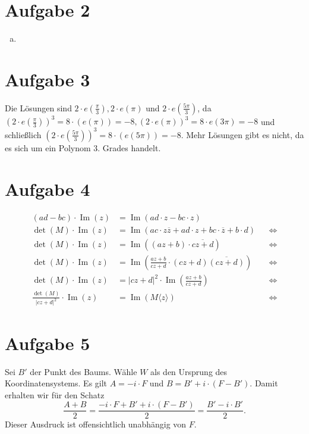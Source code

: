 \documentclass{article}
\theoremstyle{definition}
\newcommand{\Ima}{\operatorname{Im}}
\begin{document}
\section*{Aufgabe 2}
\begin{enumerate}[(a)]
	\item 
\end{enumerate}
\section*{Aufgabe 3}
Die Lösungen sind $2 \cdot e\left(\frac{\pi}{3}\right), 2 \cdot e\left(\pi\right)$ und $2 \cdot e\left(\frac{5\pi}{3}\right)$, da $\left(2 \cdot e\left(\frac{\pi}{3}\right)\right)^3 = 8 \cdot(e(\pi)) = -8, \left(2 \cdot e\left(\pi\right)\right)^3 = 8 \cdot e(3\pi) = -8$ und schließlich $\left(2 \cdot e\left(\frac{5\pi}{3}\right)\right)^3 = 8 \cdot(e(5\pi)) = -8$. Mehr Lösungen gibt es nicht, da es sich um ein Polynom 3. Grades handelt.
\section*{Aufgabe 4}
\begin{align*}
	(ad - bc) \cdot \Ima(z) &= \Ima(ad\cdot z - bc \cdot z)\\
	 \det(M) \cdot \Ima(z) &= \Ima(ac\cdot z\overline{z} + ad\cdot z + bc \cdot \overline{z} + b\cdot d)&&\Leftrightarrow\\
	 \det(M) \cdot \Ima(z) &= \Ima((az + b) \cdot \overline{cz + d})&&\Leftrightarrow\\
	 \det(M) \cdot \Ima(z) &= \Ima\left(\frac{az + b}{cz + d}\cdot (cz + d) \overline{(cz + d)}\right)&&\Leftrightarrow\\
	 \det(M) \cdot \Ima(z) &= |cz + d|^2 \cdot \Ima\left(\frac{az + b}{cz + d}\right)&&\Leftrightarrow\\
	 \frac{\det(M)}{|cz + d|^2} \cdot \Ima(z) &=  \Ima(M\langle z\rangle)&&\Leftrightarrow
\end{align*}

\section*{Aufgabe 5}
Sei $B'$ der Punkt des Baums. Wähle $W$ als den Ursprung des Koordinatensystems.
Es gilt $A = -i \cdot F$ und $B = B' + i \cdot (F - B')$. Damit erhalten wir für den Schatz
$$\frac{A + B}{2} = \frac{-i \cdot F + B' + i \cdot (F-B')}{2} = \frac{B' - i \cdot B'}{2}.$$
Dieser Ausdruck ist offensichtlich unabhängig von $F$.
\end{document}
